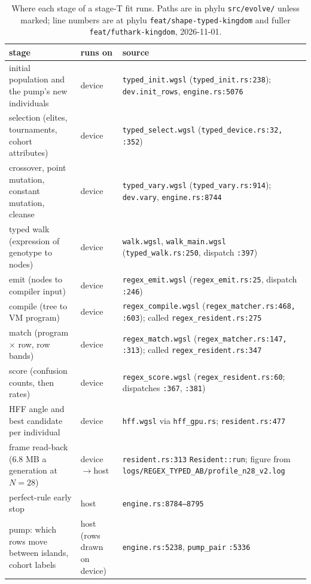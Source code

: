 \documentclass[sigconf,nonacm]{acmart}
\newcommand{\src}[1]{{\small\nolinkurl{#1}}}
\begin{document}
\begin{table}[t]
\caption{Where each stage of a stage-T fit runs. Paths are in phylu
\texttt{src/evolve/} unless marked; line numbers are at phylu
\texttt{feat/shape-typed-kingdom} and fuller \texttt{feat/futhark-kingdom},
2026-11-01.}
\label{tab:where}
\footnotesize
\begin{tabular}{@{}p{}p{}p{}@{}}
\toprule
stage & runs on & source \\
\midrule
initial population and the pump's new individuals & device & \src{typed_init.wgsl} (\src{typed_init.rs:238}); \src{dev.init_rows}, \texttt{engine.rs:5076} \\
selection (elites, tournaments, cohort attributes) & device & \src{typed_select.wgsl} (\texttt{typed\_device.rs:32, :352}) \\
crossover, point mutation, constant mutation, cleanse & device & \src{typed_vary.wgsl} (\src{typed_vary.rs:914}); \texttt{dev.vary}, \texttt{engine.rs:8744} \\
typed walk (expression of genotype to nodes) & device & \texttt{walk.wgsl}, \src{walk_main.wgsl} (\src{typed_walk.rs:250}, dispatch \texttt{:397}) \\
emit (nodes to compiler input) & device & \src{regex_emit.wgsl} (\src{regex_emit.rs:25}, dispatch \texttt{:246}) \\
compile (tree to VM program) & device & \src{regex_compile.wgsl} (\texttt{regex\_matcher.rs:468, :603}); called \src{regex_resident.rs:275} \\
match (program $\times$ row, row bands) & device & \src{regex_match.wgsl} (\texttt{regex\_matcher.rs:147, :313}); called \src{regex_resident.rs:347} \\
score (confusion counts, then rates) & device & \src{regex_score.wgsl} (\src{regex_resident.rs:60}; dispatches \texttt{:367}, \texttt{:381}) \\
HFF angle and best candidate per individual & device & \texttt{hff.wgsl} via \src{hff_gpu.rs}; \texttt{resident.rs:477} \\
frame read-back (6.8 MB a generation at $N=28$) & device$\to$host & \texttt{resident.rs:313} \src{Resident::run}; figure from \src{logs/REGEX_TYPED_AB/profile_n28_v2.log} \\
perfect-rule early stop & host & \texttt{engine.rs:8784--8795} \\
pump: which rows move between islands, cohort labels & host (rows drawn on device) & \texttt{engine.rs:5238}, \src{pump_pair} \texttt{:5336} \\

\end{tabular}
\end{table}
\end{document}
